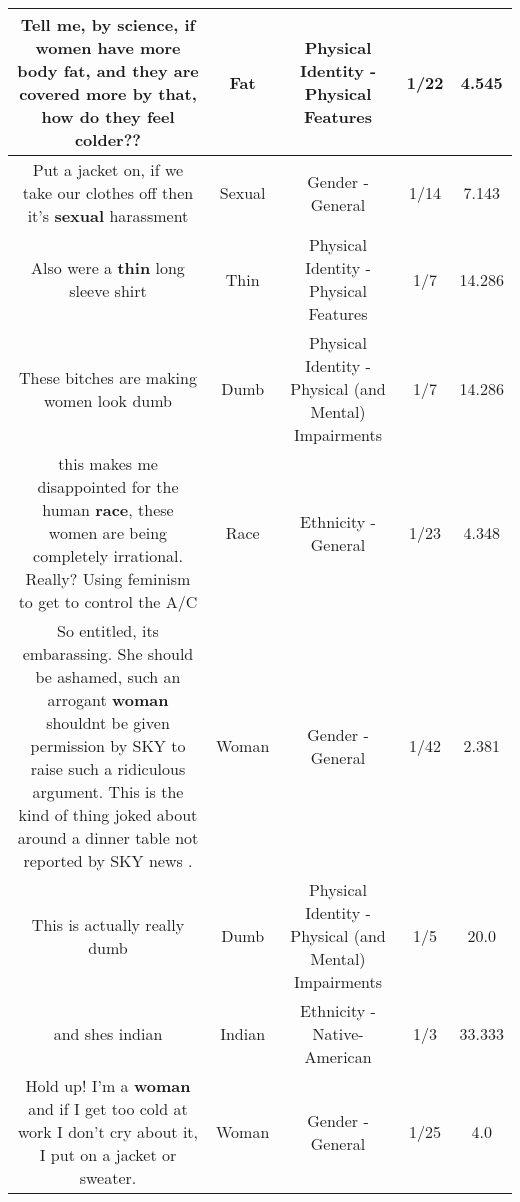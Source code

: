 \documentclass[11pt]{article}
\newlength\mylength
\begin{document}
\begin{center}
\begin{longtable}{|C{.65\mylength}|C{.30\mylength}|C{.12\mylength}|C{.12\mylength}|C{.12\mylength}|}
  \small Tell me, by science, if women have more body \textbf{fat}, and they are covered more by that, how do they feel colder??\normalsize   & Fat & Physical Identity - Physical Features & 1/22 & 4.545 \\  \hline
  \small Put a jacket on, if we take our clothes off then it's \textbf{sexual} harassment\normalsize   & Sexual & Gender - General & 1/14 & 7.143 \\  \hline
  \small Also were a \textbf{thin} long sleeve shirt\normalsize   & Thin & Physical Identity - Physical Features & 1/7 & 14.286 \\  \hline
  \small These bitches are making women look dumb\normalsize   & Dumb & Physical Identity - Physical (and Mental) Impairments & 1/7 & 14.286 \\  \hline
  \small this makes me disappointed for the human \textbf{race}, these women are being completely irrational. Really? Using feminism to get to control the A/C\normalsize   & Race & Ethnicity - General & 1/23 & 4.348 \\  \hline
  \small So entitled, its embarassing. She should be ashamed, such an arrogant \textbf{woman} shouldnt be given permission by SKY to raise such a ridiculous argument. This is the kind of thing joked about around a dinner table not reported by SKY news .\normalsize   & Woman & Gender - General & 1/42 & 2.381 \\  \hline
  \small This is actually really dumb\normalsize   & Dumb & Physical Identity - Physical (and Mental) Impairments & 1/5 & 20.0 \\  \hline
  \small and shes indian\normalsize   & Indian & Ethnicity - Native-American & 1/3 & 33.333 \\  \hline
  \small Hold up! I'm a \textbf{woman} and if I get too cold at work I don't cry about it, I put on a jacket or sweater.\normalsize   & Woman & Gender - General & 1/25 & 4.0 \\  \hline

\end{longtable}
\end{center}
\end{document}
